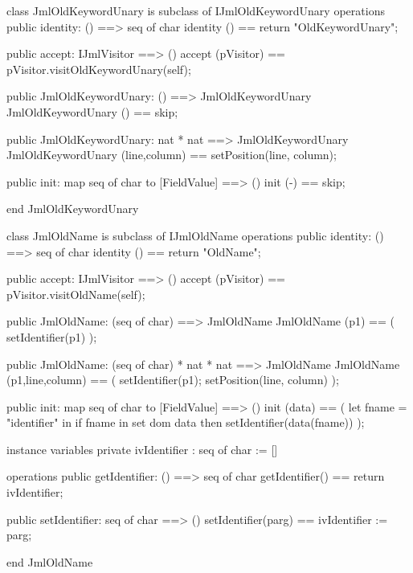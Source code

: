 \begin{vdm_al}
class JmlOldKeywordUnary is subclass of IJmlOldKeywordUnary
operations
  public identity: () ==> seq of char
  identity () == return "OldKeywordUnary";

  public accept: IJmlVisitor ==> ()
  accept (pVisitor) == pVisitor.visitOldKeywordUnary(self);

  public JmlOldKeywordUnary:
    () ==> JmlOldKeywordUnary
  JmlOldKeywordUnary () == 
    skip;

  public JmlOldKeywordUnary:
    nat *
    nat ==> JmlOldKeywordUnary
  JmlOldKeywordUnary (line,column) == 
    setPosition(line, column);

  public init: map seq of char to [FieldValue] ==> ()
  init (-) == skip;

end JmlOldKeywordUnary
\end{vdm_al}

\begin{vdm_al}
class JmlOldName is subclass of IJmlOldName
operations
  public identity: () ==> seq of char
  identity () == return "OldName";

  public accept: IJmlVisitor ==> ()
  accept (pVisitor) == pVisitor.visitOldName(self);

  public JmlOldName:
    (seq of char) ==> JmlOldName
  JmlOldName (p1) == 
    ( setIdentifier(p1) );

  public JmlOldName:
    (seq of char) *
    nat *
    nat ==> JmlOldName
  JmlOldName (p1,line,column) == 
    ( setIdentifier(p1);
      setPosition(line, column) );

  public init: map seq of char to [FieldValue] ==> ()
  init (data) ==
    ( let fname = "identifier" in
        if fname in set dom data
        then setIdentifier(data(fname)) );

instance variables
  private ivIdentifier : seq of char := []

operations
  public getIdentifier: () ==> seq of char
  getIdentifier() == return ivIdentifier;

  public setIdentifier: seq of char ==> ()
  setIdentifier(parg) == ivIdentifier := parg;

end JmlOldName
\end{vdm_al}

